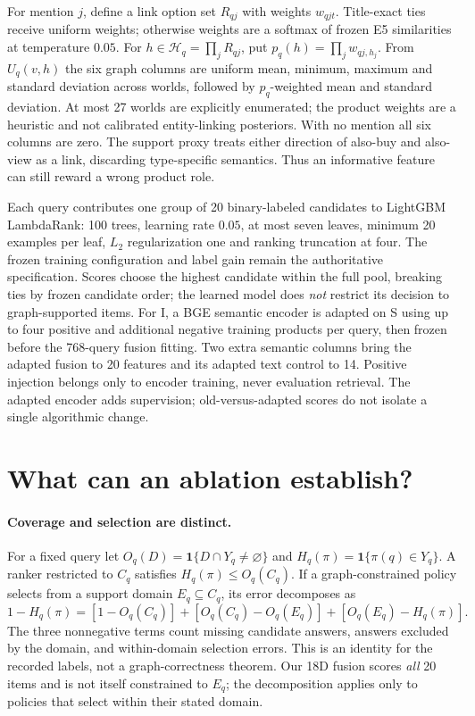 \documentclass{article}
\begin{document}
For mention $j$, define a link option set $R_{qj}$ with weights $w_{qjt}$.
Title-exact ties receive uniform weights; otherwise weights are a softmax
of frozen E5 similarities at temperature $0.05$. For
$h\in\mathcal H_q=\prod_j R_{qj}$, put
$p_q(h)=\prod_jw_{qj,h_j}$. From $U_q(v,h)$ the six graph columns are
uniform mean, minimum, maximum and standard deviation across worlds,
followed by $p_q$-weighted mean and standard deviation. At most 27 worlds
are explicitly enumerated; the product weights are a heuristic and not
calibrated entity-linking posteriors. With no mention all six columns are
zero. The support proxy treats either direction of also-buy and also-view
as a link, discarding type-specific semantics. Thus an informative feature
can still reward a wrong product role.

Each query contributes one group of 20 binary-labeled candidates to
LightGBM LambdaRank: 100 trees, learning rate $0.05$, at most seven leaves,
minimum 20 examples per leaf, $L_2$ regularization one and ranking truncation
at four. The frozen training configuration and label gain remain the
authoritative specification. Scores choose the highest candidate within
the full pool, breaking ties by frozen candidate order; the learned model
does \emph{not} restrict its decision to graph-supported items. For I, a
BGE semantic encoder is adapted on S using up to four positive and
additional negative training products per query, then frozen before
the 768-query fusion fitting. Two extra semantic columns bring the adapted
fusion to 20 features and its adapted text control to 14. Positive injection
belongs only to encoder training, never evaluation retrieval. The adapted
encoder adds supervision; old-versus-adapted scores do not isolate a single
algorithmic change.

\section{What can an ablation establish?}
\paragraph{Coverage and selection are distinct.}
For a fixed query let $O_q(D)=\mathbf{1}\{D\cap Y_q\ne\varnothing\}$
and $H_q(\pi)=\mathbf{1}\{\pi(q)\in Y_q\}$. A ranker restricted to
$C_q$ satisfies $H_q(\pi)\le O_q(C_q)$. If a graph-constrained policy
selects from a support domain $E_q\subseteq C_q$, its error decomposes as
\begin{equation}\label{eq:decomposition}
  1-H_q(\pi)=[1-O_q(C_q)]+[O_q(C_q)-O_q(E_q)]
                  +[O_q(E_q)-H_q(\pi)].
\end{equation}
The three nonnegative terms count missing candidate answers, answers excluded
by the domain, and within-domain selection errors. This is an identity for
the recorded labels, not a graph-correctness theorem. Our 18D fusion scores
\emph{all} 20 items and is not itself constrained to $E_q$; the decomposition
applies only to policies that select within their stated domain.
\end{document}
